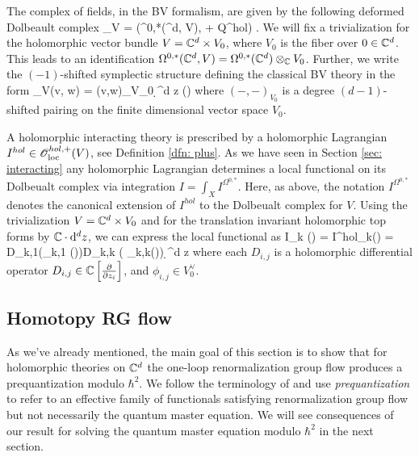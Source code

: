 \documentclass[10pt]{amsart}
\begin{document}
The complex of fields, in the BV formalism, are given by the following deformed Dolbeault complex
\ben
\sE_V = \left(\Omega^{0,*}(\CC^d, V), \dbar + Q^{hol}\right) .
\een
We will fix a trivialization for the holomorphic vector bundle $V = \mathbb C^d \times V_0$, where $V_0$ is the fiber over $0 \in \mathbb C^d$.
This leads to an identification $\Omega^{0,*}(\mathbb C^d , V) = \Omega^{0,*}(\mathbb C^d) \otimes_\mathbb C V_0$.
Further, we write the $(-1)$-shifted symplectic structure defining the classical BV theory in the form
\ben
\omega_V(\alpha \tensor v, \beta \tensor w) = (v,w)_{V_0} \int \d^d z (\alpha \wedge \beta)
\een
where $(-,-)_{V_0}$ is a degree $(d-1)$-shifted pairing on the finite dimensional vector space $V_0$. 

A holomorphic interacting theory is prescribed by a holomorphic Lagrangian $I^{hol} \in \mathscr O_{\rm loc}^{hol,+}(V)$, see Definition \ref{dfn: plus}. 
As we have seen in Section \ref{sec: interacting} any holomorphic Lagrangian determines a local functional on its Dolbeualt complex via integration $I = \int_X I^{\Omega^{0,*}}$. 
Here, as above, the notation $I^{\Omega^{0,*}}$ denotes the canonical extension of $I^{hol}$ to the Dolbeualt complex for $V$. 
Using the trivialization $V = \mathbb C^d \times V_0$ and for the translation invariant holomorphic top forms by $\mathbb C \cdot {\rm d}^d z$, we can express the local functional as
\ben
I_k (\alpha) = \int I^{hol}_k(\alpha) = \int D_{k,1}(\phi_{k,1} (\alpha))\cdots D_{k,k} ( \phi_{k,k}(\alpha)) \d^d z 
\een
where each $D_{i,j}$ is a holomorphic differential operator $D_{i,j} \in \mathbb C\left[\frac{\partial}{\partial z_i}\right]$, and $\phi_{i,j} \in V_0^\vee$.



\subsection{Homotopy RG flow}

As we've already mentioned, the main goal of this section is to show that for holomorphic theories on $\mathbb C^d$ the one-loop renormalization group flow produces a prequantization modulo $\hbar^2$. 
We follow the terminology of \cite{CosRenorm} and use {\em prequantization} to refer to an effective family of functionals satisfying renormalization group flow but not necessarily the quantum master equation. 
We will see consequences of our result for solving the quantum master equation modulo $\hbar^2$ in the next section.  
\end{document}
